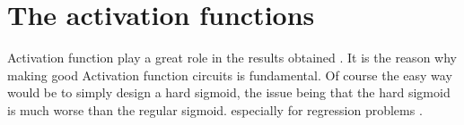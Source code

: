 \section{The activation functions}
\label{sec:af}

Activation function play a great role in the results obtained \cite{af}. It is the reason why making good Activation function circuits is fundamental. Of course the easy way would be to simply design a hard sigmoid, the issue being that the hard sigmoid is much worse than the regular sigmoid. especially for regression problems \cite{hardSigm}.

